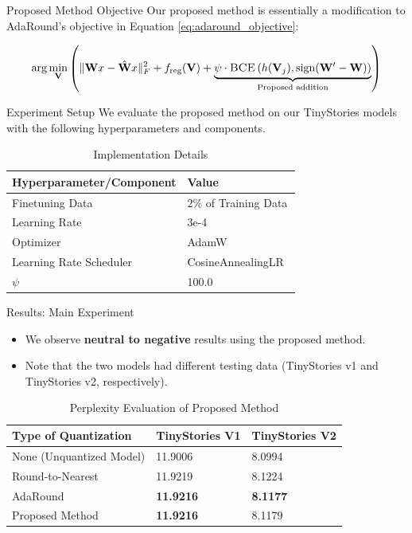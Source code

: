 \documentclass{beamer}
\begin{document}
\begin{frame}{Proposed Method Objective}
Our proposed method is essentially a modification to AdaRound's objective in Equation \ref{eq:adaround_objective}:

\begin{align}
\arg\min_{\mathbf{V}} \left( \|\mathbf{W}x - \hat{\mathbf{W}}x\|_F^2 + f_\text{reg}(\mathbf{V}) + \underbrace{\psi \cdot \textsc{BCE}\left(h(\mathbf{V}_j), \text{sign}(\mathbf{W}' - \mathbf{W})\right)}_{\text{Proposed addition}} \right)
\end{align}
\end{frame}
\begin{frame}{Experiment Setup}
  We evaluate the proposed method on our TinyStories models with the following hyperparameters and components.
\begin{table}
\centering
\caption{Implementation Details}
\label{tab:implementation_detail_2}
\begin{tabular}{ll}
\hline
\textbf{Hyperparameter/Component} & \textbf{Value} \\ \hline
Finetuning Data & $2\%$ of Training Data \\
Learning Rate & 3e-4 \\
Optimizer & AdamW~\cite{loshchilovDecoupledWeightDecay2019} \\
Learning Rate Scheduler & CosineAnnealingLR~\cite{loshchilovSGDRStochasticGradient2017} \\
$\psi$ & 100.0 \\
\hline
\end{tabular}
\end{table}
\end{frame}
\begin{frame}{Results: Main Experiment}
  \begin{itemize}
    \item We observe \textbf{neutral to negative} results using the proposed method. 
    \item Note that the two models had different testing data (TinyStories v1 and TinyStories v2, respectively).
  \end{itemize}
\begin{table}
\centering
\caption{Perplexity Evaluation of Proposed Method}
\label{tab:gradient_aware_adaround_results}
\begin{tabular}{|l|l|l|}
\hline
Type of Quantization & TinyStories V1   & TinyStories V2  \\ \hline
None (Unquantized Model)          & 11.9006          & 8.0994          \\ \hline \hline
Round-to-Nearest     & 11.9219          & 8.1224          \\ \hline
AdaRound             & \textbf{11.9216}          & \textbf{8.1177} \\ \hline
Proposed Method      & \textbf{11.9216} & 8.1179          \\ \hline
\end{tabular}
\end{table}
\end{frame}
\end{document}
